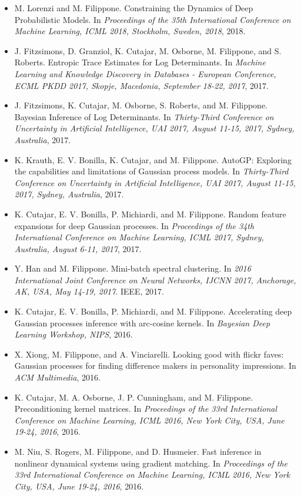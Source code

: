 \begin{itemize}
\item  M. Lorenzi and M. Filippone. Constraining the Dynamics of Deep Probabilistic Models. In \emph{Proceedings of the 35th International Conference on Machine Learning, ICML 2018, Stockholm, Sweden, 2018}, 2018.  
\item  J. Fitzsimons, D. Granziol, K. Cutajar, M. Osborne, M. Filippone, and S. Roberts. Entropic Trace Estimates for Log Determinants. In \emph{Machine Learning and Knowledge Discovery in Databases - European Conference, ECML PKDD 2017, Skopje, Macedonia, September 18-22, 2017}, 2017.  
\item  J. Fitzsimons, K. Cutajar, M. Osborne, S. Roberts, and M. Filippone. Bayesian Inference of Log Determinants. In \emph{Thirty-Third Conference on Uncertainty in Artificial Intelligence, UAI 2017, August 11-15, 2017, Sydney, Australia}, 2017.  
\item  K. Krauth, E. V. Bonilla, K. Cutajar, and M. Filippone. AutoGP: Exploring the capabilities and limitations of Gaussian process models. In \emph{Thirty-Third Conference on Uncertainty in Artificial Intelligence, UAI 2017, August 11-15, 2017, Sydney, Australia}, 2017.  
\item  K. Cutajar, E. V. Bonilla, P. Michiardi, and M. Filippone. Random feature expansions for deep Gaussian processes. In \emph{Proceedings of the 34th International Conference on Machine Learning, ICML 2017, Sydney, Australia, August 6-11, 2017}, 2017. 
\item  Y. Han and M. Filippone. Mini-batch spectral clustering. In \emph{2016 International Joint Conference on Neural Networks, IJCNN 2017, Anchorage, AK, USA, May 14-19, 2017}. IEEE, 2017. 
\item  K. Cutajar, E. V. Bonilla, P. Michiardi, and M. Filippone. Accelerating deep Gaussian processes inference with arc-cosine kernels. In \emph{Bayesian Deep Learning Workshop, NIPS}, 2016.  
\item  X. Xiong, M. Filippone, and A. Vinciarelli. Looking good with flickr faves: Gaussian processes for finding difference makers in personality impressions. In \emph{ACM Multimedia}, 2016. 
\item  K. Cutajar, M. A. Osborne, J. P. Cunningham, and M. Filippone. Preconditioning kernel matrices. In \emph{Proceedings of the 33rd International Conference on Machine Learning, ICML 2016, New York City, USA, June 19-24, 2016}, 2016. 
\item  M. Niu, S. Rogers, M. Filippone, and D. Husmeier. Fast inference in nonlinear dynamical systems using gradient matching. In \emph{Proceedings of the 33rd International Conference on Machine Learning, ICML 2016, New York City, USA, June 19-24, 2016}, 2016. 

\end{itemize}
